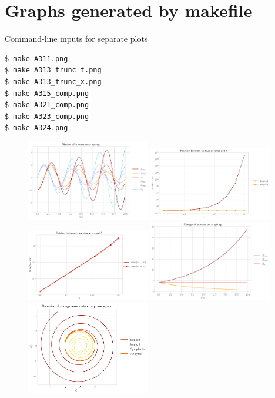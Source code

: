 \documentclass[10pt]{article}
\begin{document}
\section{Graphs generated by makefile}
Command-line inputs for separate plots
\begin{lstlisting}[language=bash]
$ make A311.png
$ make A313_trunc_t.png
$ make A313_trunc_x.png
$ make A315_comp.png
$ make A321_comp.png
$ make A323_comp.png
$ make A324.png
\end{lstlisting}
\begin{figure}
\centering
\includegraphics[width=0.48\textwidth]{A311.png}
\includegraphics[width=0.48\textwidth]{A313_trunc_t.png}
\includegraphics[width=0.48\textwidth]{A313_trunc_x.png}
\includegraphics[width=0.48\textwidth]{A315_comp.png}
\includegraphics[width=0.48\textwidth]{A321_comp.png}

\end{figure}
\end{document}
